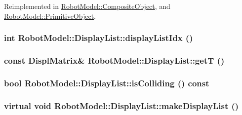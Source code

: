 Reimplemented in \hyperlink{class_robot_model_1_1_composite_object_adadc29cccbba9cb615eaf0ad2fbdd337}{RobotModel::CompositeObject}, and \hyperlink{class_robot_model_1_1_primitive_object_a69c30287deb6549fbde68d1ba37424a8}{RobotModel::PrimitiveObject}.\hypertarget{class_robot_model_1_1_display_list_a2c405729d9a5d904b9c292fd87c3be05}{
\subsubsection[{displayListIdx}]{\setlength{\rightskip}{0pt plus 5cm}int RobotModel::DisplayList::displayListIdx ()}}
\label{class_robot_model_1_1_display_list_a2c405729d9a5d904b9c292fd87c3be05}
\hypertarget{class_robot_model_1_1_display_list_a2e08e72148fc8bb77a693b769a16711a}{
\subsubsection[{getT}]{\setlength{\rightskip}{0pt plus 5cm}const {\bf DisplMatrix}\& RobotModel::DisplayList::getT ()}}
\label{class_robot_model_1_1_display_list_a2e08e72148fc8bb77a693b769a16711a}
\hypertarget{class_robot_model_1_1_display_list_a32f1a046e32b479110977c5efec41cc3}{
\subsubsection[{isColliding}]{\setlength{\rightskip}{0pt plus 5cm}bool RobotModel::DisplayList::isColliding () const}}
\label{class_robot_model_1_1_display_list_a32f1a046e32b479110977c5efec41cc3}
\hypertarget{class_robot_model_1_1_display_list_a842de97924298c7363e50aebd69e5a50}{
\subsubsection[{makeDisplayList}]{\setlength{\rightskip}{0pt plus 5cm}virtual void RobotModel::DisplayList::makeDisplayList ()}}
\label{class_robot_model_1_1_display_list_a842de97924298c7363e50aebd69e5a50}


